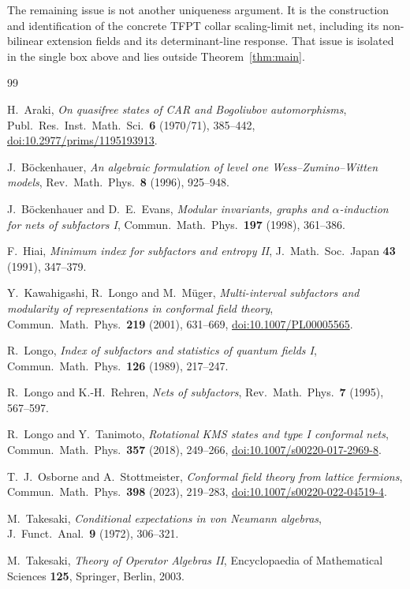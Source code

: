 The remaining issue is not another uniqueness argument.  It is the
construction and identification of the concrete TFPT collar
scaling-limit net, including its non-bilinear extension fields and
its determinant-line response.  That issue is isolated in the
single box above and lies outside Theorem~\ref{thm:main}.

\begin{thebibliography}{99}

H.~Araki,
\emph{On quasifree states of CAR and Bogoliubov automorphisms},
Publ.\ Res.\ Inst.\ Math.\ Sci.\ \textbf{6} (1970/71), 385--442,
\href{https://doi.org/10.2977/prims/1195193913}
{doi:10.2977/prims/1195193913}.

J.~B\"ockenhauer,
\emph{An algebraic formulation of level one Wess--Zumino--Witten
models},
Rev.\ Math.\ Phys.\ \textbf{8} (1996), 925--948.

J.~B\"ockenhauer and D.~E.~Evans,
\emph{Modular invariants, graphs and $\alpha$-induction for nets of
subfactors I},
Commun.\ Math.\ Phys.\ \textbf{197} (1998), 361--386.

F.~Hiai,
\emph{Minimum index for subfactors and entropy II},
J.\ Math.\ Soc.\ Japan \textbf{43} (1991), 347--379.

Y.~Kawahigashi, R.~Longo and M.~M\"uger,
\emph{Multi-interval subfactors and modularity of representations
in conformal field theory},
Commun.\ Math.\ Phys.\ \textbf{219} (2001), 631--669,
\href{https://doi.org/10.1007/PL00005565}
{doi:10.1007/PL00005565}.

R.~Longo,
\emph{Index of subfactors and statistics of quantum fields I},
Commun.\ Math.\ Phys.\ \textbf{126} (1989), 217--247.

R.~Longo and K.-H.~Rehren,
\emph{Nets of subfactors},
Rev.\ Math.\ Phys.\ \textbf{7} (1995), 567--597.

R.~Longo and Y.~Tanimoto,
\emph{Rotational KMS states and type I conformal nets},
Commun.\ Math.\ Phys.\ \textbf{357} (2018), 249--266,
\href{https://doi.org/10.1007/s00220-017-2969-8}
{doi:10.1007/s00220-017-2969-8}.

T.~J.~Osborne and A.~Stottmeister,
\emph{Conformal field theory from lattice fermions},
Commun.\ Math.\ Phys.\ \textbf{398} (2023), 219--283,
\href{https://doi.org/10.1007/s00220-022-04519-4}
{doi:10.1007/s00220-022-04519-4}.

M.~Takesaki,
\emph{Conditional expectations in von Neumann algebras},
J.\ Funct.\ Anal.\ \textbf{9} (1972), 306--321.

M.~Takesaki,
\emph{Theory of Operator Algebras II},
Encyclopaedia of Mathematical Sciences \textbf{125},
Springer, Berlin, 2003.

\end{thebibliography}


